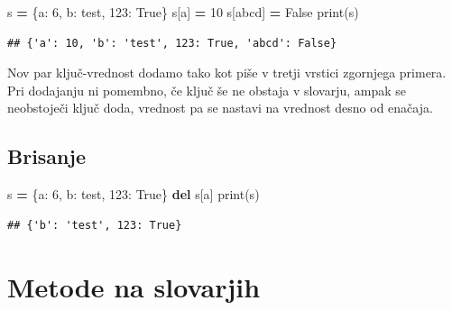 \documentclass[
]{report}
\newenvironment{Shaded}{\begin{snugshade}}{\end{snugshade}}
\newcommand{\BuiltInTok}[1]{#1}
\newcommand{\DecValTok}[1]{\textcolor[rgb]{0.00,0.00,0.81}{#1}}
\newcommand{\KeywordTok}[1]{\textcolor[rgb]{0.13,0.29,0.53}{\textbf{#1}}}
\newcommand{\NormalTok}[1]{#1}
\newcommand{\OperatorTok}[1]{\textcolor[rgb]{0.81,0.36,0.00}{\textbf{#1}}}
\newcommand{\StringTok}[1]{\textcolor[rgb]{0.31,0.60,0.02}{#1}}
\newcommand{\VariableTok}[1]{\textcolor[rgb]{0.00,0.00,0.00}{#1}}
\begin{document}
\begin{Shaded}
\begin{Highlighting}[]
\NormalTok{s }\OperatorTok{=}\NormalTok{ \{}\StringTok{\textquotesingle{}a\textquotesingle{}}\NormalTok{: }\DecValTok{6}\NormalTok{, }\StringTok{\textquotesingle{}b\textquotesingle{}}\NormalTok{: }\StringTok{\textquotesingle{}test\textquotesingle{}}\NormalTok{, }\DecValTok{123}\NormalTok{: }\VariableTok{True}\NormalTok{\}}
\NormalTok{s[}\StringTok{\textquotesingle{}a\textquotesingle{}}\NormalTok{] }\OperatorTok{=} \DecValTok{10}
\NormalTok{s[}\StringTok{\textquotesingle{}abcd\textquotesingle{}}\NormalTok{] }\OperatorTok{=} \VariableTok{False}
\BuiltInTok{print}\NormalTok{(s)}
\end{Highlighting}
\end{Shaded}

\begin{verbatim}
## {'a': 10, 'b': 'test', 123: True, 'abcd': False}
\end{verbatim}

Nov par ključ-vrednost dodamo tako kot piše v tretji vrstici zgornjega primera. Pri dodajanju ni pomembno, če ključ še ne obstaja v slovarju, ampak se neobstoječi ključ doda, vrednost pa se nastavi na vrednost desno od enačaja.

\hypertarget{brisanje}{%
\subsection{Brisanje}\label{brisanje}}

\begin{Shaded}
\begin{Highlighting}[]
\NormalTok{s }\OperatorTok{=}\NormalTok{ \{}\StringTok{\textquotesingle{}a\textquotesingle{}}\NormalTok{: }\DecValTok{6}\NormalTok{, }\StringTok{\textquotesingle{}b\textquotesingle{}}\NormalTok{: }\StringTok{\textquotesingle{}test\textquotesingle{}}\NormalTok{, }\DecValTok{123}\NormalTok{: }\VariableTok{True}\NormalTok{\}}
\KeywordTok{del}\NormalTok{ s[}\StringTok{\textquotesingle{}a\textquotesingle{}}\NormalTok{]}
\BuiltInTok{print}\NormalTok{(s)}
\end{Highlighting}
\end{Shaded}

\begin{verbatim}
## {'b': 'test', 123: True}
\end{verbatim}

\hypertarget{metode-na-slovarjih}{%
\section{Metode na slovarjih}\label{metode-na-slovarjih}}
\end{document}
